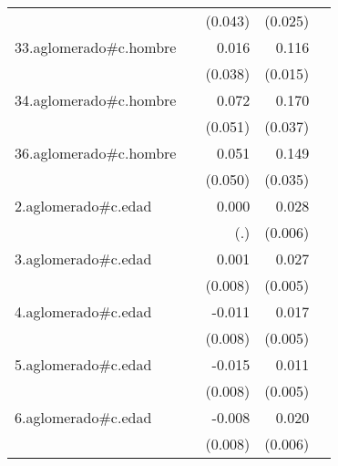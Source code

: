 {\begin{longtable}{l*{4}{D{.}{.}{-1}}}
            &                     &     (0.043)         &     (0.025)         &                     \\
\addlinespace
33.aglomerado#c.hombre&                     &       0.016         &       0.116\sym{***}&                     \\
            &                     &     (0.038)         &     (0.015)         &                     \\
\addlinespace
34.aglomerado#c.hombre&                     &       0.072         &       0.170\sym{***}&                     \\
            &                     &     (0.051)         &     (0.037)         &                     \\
\addlinespace
36.aglomerado#c.hombre&                     &       0.051         &       0.149\sym{***}&                     \\
            &                     &     (0.050)         &     (0.035)         &                     \\
\addlinespace
2.aglomerado#c.edad&                     &       0.000         &       0.028\sym{***}&                     \\
            &                     &         (.)         &     (0.006)         &                     \\
\addlinespace
3.aglomerado#c.edad&                     &       0.001         &       0.027\sym{***}&                     \\
            &                     &     (0.008)         &     (0.005)         &                     \\
\addlinespace
4.aglomerado#c.edad&                     &      -0.011         &       0.017\sym{**} &                     \\
            &                     &     (0.008)         &     (0.005)         &                     \\
\addlinespace
5.aglomerado#c.edad&                     &      -0.015         &       0.011\sym{*}  &                     \\
            &                     &     (0.008)         &     (0.005)         &                     \\
\addlinespace
6.aglomerado#c.edad&                     &      -0.008         &       0.020\sym{**} &                     \\
            &                     &     (0.008)         &     (0.006)         &                     \\

\end{longtable}}
